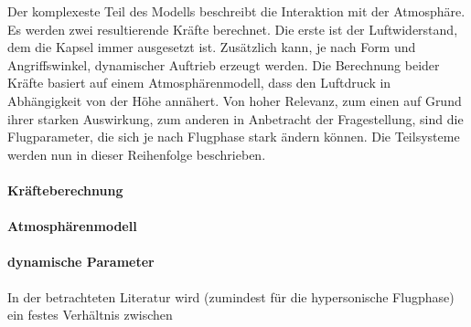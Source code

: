 Der komplexeste Teil des Modells beschreibt die Interaktion mit der Atmosphäre. Es werden zwei resultierende Kräfte berechnet. Die erste ist der Luftwiderstand, dem die Kapsel immer ausgesetzt ist. Zusätzlich kann, je nach Form und Angriffswinkel, dynamischer Auftrieb erzeugt werden. Die Berechnung beider Kräfte basiert auf einem Atmosphärenmodell, dass den Luftdruck in Abhängigkeit von der Höhe annähert. Von hoher Relevanz, zum einen auf Grund ihrer starken Auswirkung, zum anderen in Anbetracht der Fragestellung, sind die Flugparameter, die sich je nach Flugphase stark ändern können. Die Teilsysteme werden nun in dieser Reihenfolge beschrieben.

\paragraph{Kräfteberechnung}


\paragraph{Atmosphärenmodell}


\paragraph{dynamische Parameter}

		
In der betrachteten Literatur wird (zumindest für die hypersonische Flugphase) ein festes Verhältnis zwischen		